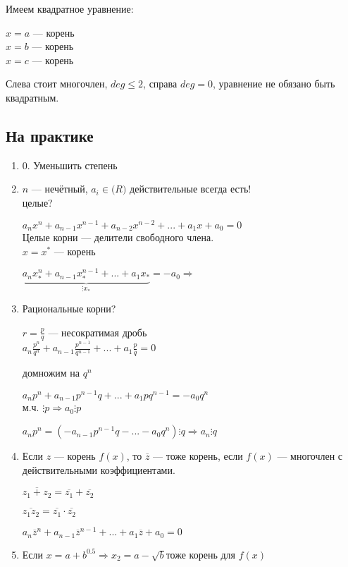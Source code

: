 \documentclass{article}
\begin{document}
    Имеем квадратное уравнение:
    
    \(x = a\) --- корень\\
    \(x = b\) --- корень\\
    \(x = c\) --- корень
    
    Слева стоит многочлен, \(deg \leq 2\), справа \(deg = 0\), уравнение не обязано быть квадратным.
    
    \subsection{На практике}
        \begin {enumerate}
            \item[\(0\).] Уменьшить степень
            \item \(n\) --- нечётный, \(a_i \in \mathbb(R)\) действительные всегда есть!\\
            целые?
            
                \( a_{n}x^{n} + a_{n-1}x^{n-1} + a_{n-2}x^{n-2} +... + a_1x + a_0 = 0\)\\
                Целые корни --- делители свободного члена.\\

            \(x = x^*\) --- корень
            
            \( \underset{\vdots x_*}{\underbrace{a_{n}x^{n}_* + a_{n-1}x^{n-1}_* + ... + a_1x_*}} = -a_0 \Rightarrow\)
        
            \item Рациональные корни?
            
            \(r = \frac{p}{q}\) --- несократимая дробь\\
            \( a_{n}\frac{p^{n}}{q^n} + a_{n-1}\frac{p^{n-1}}{q^{n-1}} + ... + a_{1}\frac{p}{q} = 0\)
            
            домножим на \(q^n\)

            \(a_{n}p^{n} + a_{n-1}p^{n-1}q + ... + a_{1}pq^{n-1} = -a_{0}q^n\)\\
            м.ч. \(\vdots p \Rightarrow a_0 \vdots p\)
            
            \(a_np^n=(-a_{n-1}p^{n-1}q -...-a_0q^n) \vdots q \Rightarrow a_n\vdots q\)

            \item Если  \(z\) --- корень \(f(x)\), то \(\overline{z}\) --- тоже корень, если \(f(x)\) --- многочлен с действительными коэффициентами.
            
            \(\overline{z_1+z_2} = \overline{z_1}+\overline{z_2}\)

            \(\overline{z_1z_2}=\overline{z_1}\cdot\overline{z_2}\)

            \(a_n\overline{z}^n + a_{n-1}\overline{z}^{n-1}+...+a_1\overline{z}+a_0=0\)
        
            \item Если \(x = a + b^{0.5} \Rightarrow x_2 = a - \sqrt{b}\)тоже корень для \(f(x)\)\\ 
        \end{enumerate}
\end{document}
